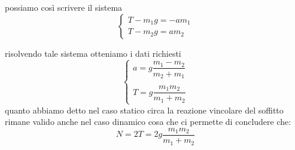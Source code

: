\documentclass[a4paper,10pt,oneside]{article}
\begin{document}
possiamo così scrivere il sistema
\begin{equation}
\begin{cases}
 T-m_1g=-am_1\\
 T-m_2g=am_2
\end{cases}
\end{equation}

risolvendo tale sistema otteniamo i dati richiesti
\begin{equation}
 \begin{cases}
  a=g\dfrac{m_1-m_2}{m_2+m_1}\\
\\
  T=g\dfrac{m_1m_2}{m_1+m_2}
 \end{cases}
\end{equation}
quanto abbiamo detto nel caso statico circa la reazione vincolare del soffitto rimane valido anche nel caso dinamico cosa che ci permette di concludere che:
\begin{equation}
 N=2T=2g\dfrac{m_1m_2}{m_1+m_2}
\end{equation}
\end{document}
